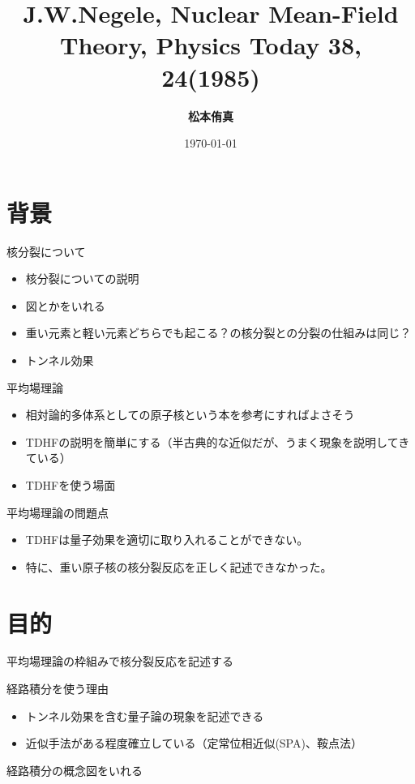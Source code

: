 \documentclass[14pt,aspectratio=169,xcolor=dvipsnames,table,dvipdfmx]{beamer}
\title{J.W.Negele, Nuclear Mean-Field Theory, Physics Today 38, 24(1985)}
\author{\textbf{松本侑真}}
\date{\today}
\institute{}
\theoremstyle{definition}
\begin{document}
\maketitle
\frame{\tableofcontents[hideallsubsections]}

\section{背景}
\begin{frame}{核分裂について}
  \begin{itemize}
    \item 核分裂についての説明
    \item 図とかをいれる
    \item 重い元素と軽い元素どちらでも起こる？の核分裂との分裂の仕組みは同じ？
    \item トンネル効果
  \end{itemize}
\end{frame}

\begin{frame}{平均場理論}
  \begin{itemize}
    \item 相対論的多体系としての原子核という本を参考にすればよさそう
    \item TDHFの説明を簡単にする（半古典的な近似だが、うまく現象を説明してきている）
    \item TDHFを使う場面
  \end{itemize}
  \begin{block}{平均場理論の問題点}
    \begin{itemize}
      \item TDHFは量子効果を適切に取り入れることができない。
      \item 特に、重い原子核の核分裂反応を正しく記述できなかった。
    \end{itemize}
  \end{block}

\end{frame}


\section{目的}
\begin{frame}{平均場理論の枠組みで核分裂反応を記述する}
  \begin{block}{経路積分を使う理由}
    \begin{itemize}
      \item トンネル効果を含む量子論の現象を記述できる
      \item 近似手法がある程度確立している（定常位相近似(SPA)、鞍点法）
    \end{itemize}
  \end{block}
  経路積分の概念図をいれる
\end{frame}
\end{document}
